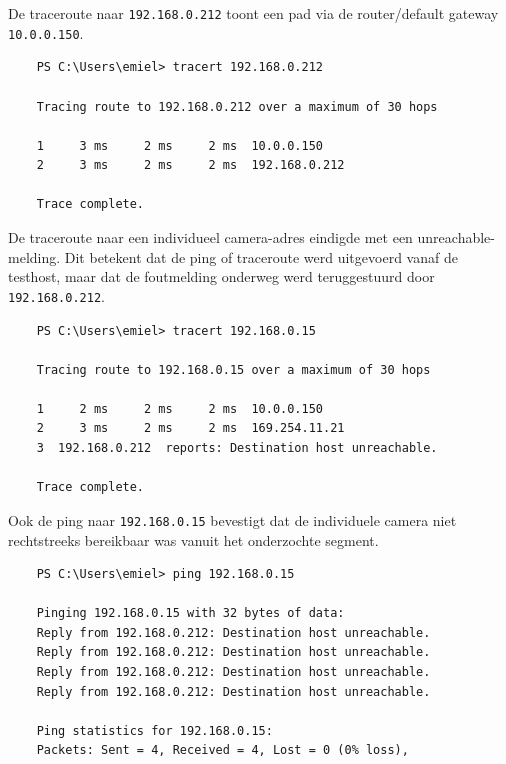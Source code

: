 De traceroute naar \texttt{192.168.0.212} toont een pad via de router/default gateway \texttt{10.0.0.150}.

\begin{verbatim}
    PS C:\Users\emiel> tracert 192.168.0.212
    
    Tracing route to 192.168.0.212 over a maximum of 30 hops
    
    1     3 ms     2 ms     2 ms  10.0.0.150
    2     3 ms     2 ms     2 ms  192.168.0.212
    
    Trace complete.
\end{verbatim}

De traceroute naar een individueel camera-adres eindigde met een unreachable-melding. Dit betekent dat de ping of traceroute werd uitgevoerd vanaf de testhost, maar dat de foutmelding onderweg werd teruggestuurd door \texttt{192.168.0.212}.

\begin{verbatim}
    PS C:\Users\emiel> tracert 192.168.0.15
    
    Tracing route to 192.168.0.15 over a maximum of 30 hops
    
    1     2 ms     2 ms     2 ms  10.0.0.150
    2     3 ms     2 ms     2 ms  169.254.11.21
    3  192.168.0.212  reports: Destination host unreachable.
    
    Trace complete.
\end{verbatim}

Ook de ping naar \texttt{192.168.0.15} bevestigt dat de individuele camera niet rechtstreeks bereikbaar was vanuit het onderzochte segment.

\begin{verbatim}
    PS C:\Users\emiel> ping 192.168.0.15
    
    Pinging 192.168.0.15 with 32 bytes of data:
    Reply from 192.168.0.212: Destination host unreachable.
    Reply from 192.168.0.212: Destination host unreachable.
    Reply from 192.168.0.212: Destination host unreachable.
    Reply from 192.168.0.212: Destination host unreachable.
    
    Ping statistics for 192.168.0.15:
    Packets: Sent = 4, Received = 4, Lost = 0 (0% loss),
\end{verbatim}

\section{}%
\label{app:h3-diensten}

